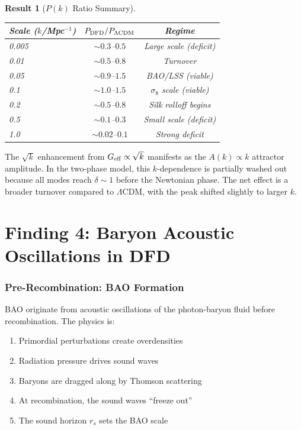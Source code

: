 \documentclass[11pt]{article}
\newtheorem{result}{Result}
\newcommand{\LCDM}{$\Lambda$CDM}
\newcommand{\Geff}{G_{\rm eff}}
\begin{document}
\begin{result}[$P(k)$ Ratio Summary]
\label{res:Pk-ratio}
\begin{center}
\begin{tabular}{lcc}
\toprule
Scale ($k$/Mpc$^{-1}$) & $P_{\rm DFD}/P_{\Lambda\rm CDM}$ & Regime \\
\midrule
0.005 & $\sim 0.3$--$0.5$ & Large scale (deficit) \\
0.01 & $\sim 0.5$--$0.8$ & Turnover \\
0.05 & $\sim 0.9$--$1.5$ & BAO/LSS (viable) \\
0.1 & $\sim 1.0$--$1.5$ & $\sigma_8$ scale (viable) \\
0.2 & $\sim 0.5$--$0.8$ & Silk rolloff begins \\
0.5 & $\sim 0.1$--$0.3$ & Small scale (deficit) \\
1.0 & $\sim 0.02$--$0.1$ & Strong deficit \\
\bottomrule
\end{tabular}
\end{center}
\end{result}

The $\sqrt{k}$ enhancement from $\Geff \propto \sqrt{k}$ manifests
as the $A(k) \propto k$ attractor amplitude. In the two-phase model,
this $k$-dependence is partially washed out because all modes reach
$\delta \sim 1$ before the Newtonian phase. The net effect is a
broader turnover compared to \LCDM, with the peak shifted slightly
to larger $k$.


\part{Finding 4: Baryon Acoustic Oscillations in DFD}
\label{part:BAO}

\section{Pre-Recombination: BAO Formation}

BAO originate from acoustic oscillations of the photon-baryon fluid
before recombination. The physics is:
\begin{enumerate}
\item Primordial perturbations create overdensities
\item Radiation pressure drives sound waves
\item Baryons are dragged along by Thomson scattering
\item At recombination, the sound waves ``freeze out''
\item The sound horizon $r_s$ sets the BAO scale
\end{enumerate}
\end{document}
